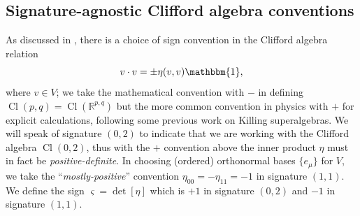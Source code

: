 \documentclass[10pt,a4paper]{amsart}
\numberwithin{equation}{section}
\newcommand{\RR}{\mathbb{R}}
\newcommand{\1}{\mathbbm{1}}
\DeclareMathOperator{\Cl}{Cl}
\begin{document}
\subsection{Signature-agnostic Clifford algebra conventions}
\label{sec:gamma-matrix}

As discussed in \cite[Appendix~A.1.2]{Beckett2024_2}, there is a choice of sign convention in the Clifford algebra relation
\begin{equation}\label{eq:clifford-rel}
	v\cdot v = \pm\eta(v,v)\1,
\end{equation}
where $v\in V$; we take the mathematical convention with $-$ in defining $\Cl(p,q)=\Cl(\RR^{p,q})$ but the more common convention in physics with $+$ for explicit calculations, following some previous work on Killing superalgebras. We will speak of signature $(0,2)$ to indicate that we are working with the Clifford algebra $\Cl(0,2)$, thus with the $+$ convention above the inner product $\eta$ must in fact be \emph{positive-definite}. In choosing (ordered) orthonormal bases $\{e_\mu\}$ for $V$, we take the ``\emph{mostly-positive}'' convention $\eta_{00}=-\eta_{11}=-1$ in signature $(1,1)$. We define the sign
$
	\varsigma=\det[\eta]
$
which is $+1$ in signature $(0,2)$ and $-1$ in signature $(1,1)$.
\end{document}
